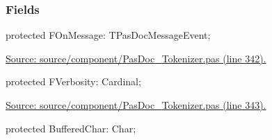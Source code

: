 \documentclass{report}
\newif\ifpdf
\begin{document}
\subsubsection*{\large{\textbf{Fields}}\normalsize\hspace{1ex}\hfill}
\begin{list}{}{
\setlength{\itemindent}{0cm}
\setlength{\listparindent}{0cm}
\setlength{\leftmargin}{\evensidemargin}
\addtolength{\leftmargin}{\tmplength}
\settowidth{\labelsep}{X}
\addtolength{\leftmargin}{\labelsep}
\setlength{\labelwidth}{\tmplength}
}
\label{PasDoc_Tokenizer.TTokenizer-FOnMessage}
\item[\textbf{FOnMessage}\hfill]
\ifpdf
\begin{flushleft}
\fi
\begin{ttfamily}
protected FOnMessage: TPasDocMessageEvent;\end{ttfamily}

\ifpdf
\end{flushleft}
\fi


\par  \par
\href{https://github.com/pasdoc/pasdoc/blob/master/source/component/PasDoc_Tokenizer.pas#L342}{Source: source/component/PasDoc{\_}Tokenizer.pas (line 342).}\label{PasDoc_Tokenizer.TTokenizer-FVerbosity}
\item[\textbf{FVerbosity}\hfill]
\ifpdf
\begin{flushleft}
\fi
\begin{ttfamily}
protected FVerbosity: Cardinal;\end{ttfamily}

\ifpdf
\end{flushleft}
\fi


\par  \par
\href{https://github.com/pasdoc/pasdoc/blob/master/source/component/PasDoc_Tokenizer.pas#L343}{Source: source/component/PasDoc{\_}Tokenizer.pas (line 343).}\label{PasDoc_Tokenizer.TTokenizer-BufferedChar}
\item[\textbf{BufferedChar}\hfill]
\ifpdf
\begin{flushleft}
\fi
\begin{ttfamily}
protected BufferedChar: Char;\end{ttfamily}

\ifpdf
\end{flushleft}
\fi



\end{list}
\end{document}
